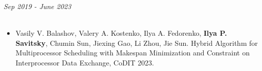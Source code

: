 \documentclass{resume} %
\begin{document}
\begin{rSection}{}

{\bf {} } \hfill {\em Sep 2019 - June 2023} \\
{\bf {}}
\\{ \textit { }}

\end{rSection}

\begin{rSection}{}
\begin{itemize}
    \item Vasily V. Balashov, Valery A. Kostenko, Ilya A. Fedorenko, \textbf{Ilya P. Savitsky}, Chumin Sun, Jiexing Gao, Li Zhou, Jie Sun. Hybrid Algorithm for Multiprocessor Scheduling with Makespan Minimization and Constraint on Interprocessor Data Exchange, CoDIT 2023.
\end{itemize}
\end{rSection}
\end{document}
